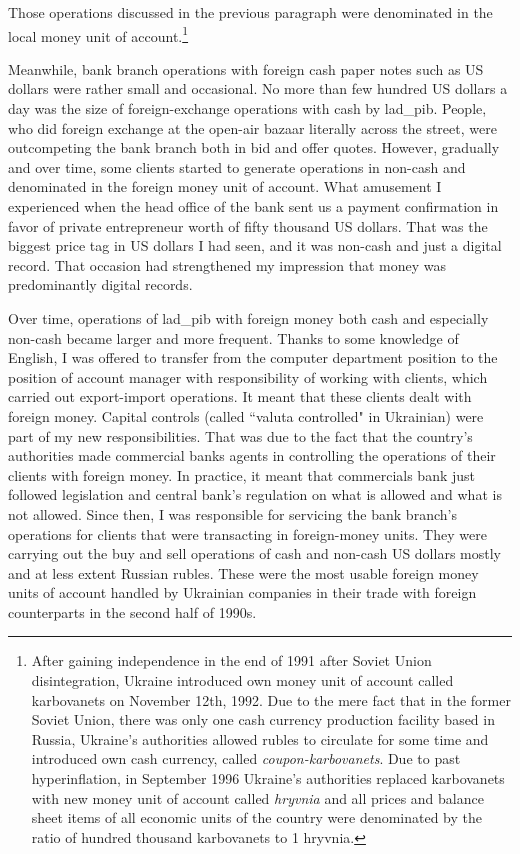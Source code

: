 Those operations discussed in the previous paragraph were denominated in the local money unit of account.\footnote{After gaining independence in the end of 1991 after Soviet Union disintegration, Ukraine introduced own money unit of account called karbovanets on November 12th, 1992. Due to the mere fact that in the former Soviet Union, there was only one cash currency production facility based in Russia, Ukraine's authorities allowed rubles to circulate for some time and introduced own cash currency, called \textit{coupon-karbovanets}. Due to past hyperinflation, in September 1996 Ukraine's authorities replaced karbovanets with new money unit of account called \textit{hryvnia} and all prices and balance sheet items of all economic units of the country were denominated by the ratio of hundred thousand karbovanets to 1 hryvnia.} 

Meanwhile, bank branch operations with foreign cash paper notes such as US dollars were rather small and occasional. No more than few hundred US dollars a day was the size of foreign-exchange operations with cash by \ac{lad_pib}. People, who did foreign exchange at the open-air bazaar literally across the street, were outcompeting the bank branch both in bid and offer quotes. However, gradually and over time, some clients started to generate operations in non-cash and denominated in the foreign money unit of account. What amusement I experienced when the head office of the bank sent us a payment confirmation in favor of private entrepreneur worth of fifty thousand US dollars. That was the biggest price tag in US dollars I had seen, and it was non-cash and just a digital record. That occasion had strengthened my impression that money was predominantly digital records. 

Over time, operations of \ac{lad_pib} with foreign money both cash and especially non-cash became larger and more frequent. Thanks to some knowledge of English, I was offered to transfer from the computer department position to the position of account manager with responsibility of working with clients, which carried out export-import operations. It meant that these clients dealt with foreign money. Capital controls (called ``valuta controlled" in Ukrainian) were part of my new responsibilities. That was due to the fact that the country's authorities made commercial banks agents in controlling the operations of their clients with foreign money. In practice, it meant that commercials bank just followed legislation and central bank's regulation on what is allowed and what is not allowed. Since then, I was responsible for servicing the bank branch's operations for clients that were transacting in foreign-money units. They were carrying out the buy and sell operations of cash and non-cash US dollars mostly and at less extent Russian rubles. These were the most usable foreign money units of account handled by Ukrainian companies in their trade with foreign counterparts in the second half of 1990s. 

